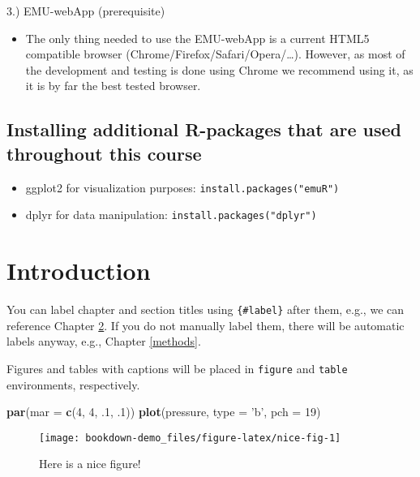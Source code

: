 \documentclass[]{book}
\newenvironment{Shaded}{\begin{snugshade}}{\end{snugshade}}
\newcommand{\KeywordTok}[1]{\textcolor[rgb]{0.13,0.29,0.53}{\textbf{{#1}}}}
\newcommand{\DataTypeTok}[1]{\textcolor[rgb]{0.13,0.29,0.53}{{#1}}}
\newcommand{\DecValTok}[1]{\textcolor[rgb]{0.00,0.00,0.81}{{#1}}}
\newcommand{\StringTok}[1]{\textcolor[rgb]{0.31,0.60,0.02}{{#1}}}
\newcommand{\NormalTok}[1]{{#1}}
\providecommand{\tightlist}{%
  \setlength{\itemsep}{0pt}\setlength{\parskip}{0pt}}
\theoremstyle{definition}
\theoremstyle{definition}
\theoremstyle{definition}
\theoremstyle{remark}
\begin{document}
3.) EMU-webApp (prerequisite)

\begin{itemize}
\tightlist
\item
  The only thing needed to use the EMU-webApp is a current HTML5
  compatible browser (Chrome/Firefox/Safari/Opera/\ldots{}). However, as
  most of the development and testing is done using Chrome we recommend
  using it, as it is by far the best tested browser.
\end{itemize}

\section{Installing additional R-packages that are used throughout this
course}\label{installing-additional-r-packages-that-are-used-throughout-this-course}

\begin{itemize}
\tightlist
\item
  ggplot2 for visualization purposes: \texttt{install.packages("emuR")}
\item
  dplyr for data manipulation: \texttt{install.packages("dplyr")}
\end{itemize}

\chapter{Introduction}\label{intro}

You can label chapter and section titles using \texttt{\{\#label\}}
after them, e.g., we can reference Chapter \ref{intro}. If you do not
manually label them, there will be automatic labels anyway, e.g.,
Chapter \ref{methods}.

Figures and tables with captions will be placed in \texttt{figure} and
\texttt{table} environments, respectively.

\begin{Shaded}
\begin{Highlighting}[]
\KeywordTok{par}\NormalTok{(}\DataTypeTok{mar =} \KeywordTok{c}\NormalTok{(}\DecValTok{4}\NormalTok{, }\DecValTok{4}\NormalTok{, .}\DecValTok{1}\NormalTok{, .}\DecValTok{1}\NormalTok{))}
\KeywordTok{plot}\NormalTok{(pressure, }\DataTypeTok{type =} \StringTok{'b'}\NormalTok{, }\DataTypeTok{pch =} \DecValTok{19}\NormalTok{)}
\end{Highlighting}
\end{Shaded}

\begin{figure}

{\centering \texttt{[image: bookdown-demo\_files/figure-latex/nice-fig-1]} 

}

\caption{Here is a nice figure!}\label{fig:nice-fig}
\end{figure}
\end{document}
